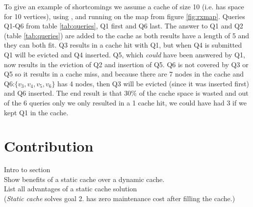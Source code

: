 To give an example of \lrus shortcomings we assume a cache of size 10 (i.e. has space for 10 vertices), using \lruns, and running on the map from figure \ref{fig:rxmap}. Queries Q1-Q6 from table \ref{tab:queries}, Q1 first and Q6 last.
The answer to Q1 and Q2 (table \ref{tab:queries}) are added to the cache as both results have a length of 5 and they can both fit. Q3 results in a cache hit with Q1, but when Q4 is submitted Q1 will be evicted and Q4 inserted. Q5, which \textit{could} have been answered by Q1, now results in the eviction of Q2 and insertion of Q5. Q6 is not covered by Q3 or Q5 so it results in a cache miss, and because there are 7 nodes in the cache and Q6:$\{v_3,v_4,v_5,v_6\}$ has 4 nodes, then Q3 will be evicted (since it was inserted first) and Q6 inserted. 
The end result is that 30\% of the cache space is wasted and out of the 6 queries only we only resulted in a 1 cache hit, we could have had 3 if we kept Q1 in the cache.












\section{Contribution} \label{sec:contribution}

Intro to section \\
Show benefits of a static cache over a dynamic cache.\\
List all advantages of a static cache solution \\
(\textit{Static cache} solves goal 2. has zero maintenance cost after filling the cache.)

